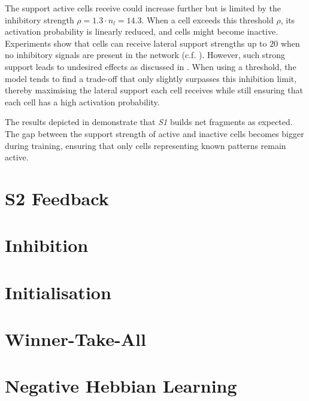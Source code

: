 The support active cells receive could increase further but is limited by the inhibitory strength $\rho = 1.3\cdot n_l = 14.3$.
When a cell exceeds this threshold $\rho$, its activation probability is linearly reduced, and cells might become inactive.
Experiments show that cells can receive lateral support strengths up to $20$ when no inhibitory signals are present in the network (c.f. ).
However, such strong support leads to undesired effects as discussed in .
When using a threshold, the model tends to find a trade-off that only slightly surpasses this inhibition limit, thereby maximising the lateral support each cell receives while still ensuring that each cell has a high activation probability.

The results depicted in  demonstrate that \emph{S1} builds net fragments as expected. The gap between the support strength of active and inactive cells becomes bigger during training, ensuring that only cells representing known patterns remain active.









\section{S2 Feedback}

\section{Inhibition}

\section{Initialisation}

\section{Winner-Take-All}

\section{Negative Hebbian Learning}


